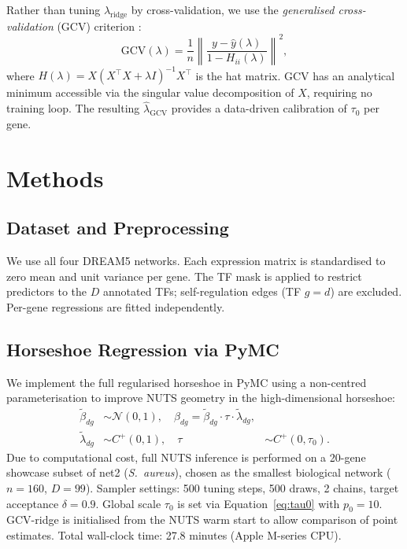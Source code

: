 \documentclass[11pt]{article}
\begin{document}
Rather than tuning $\lambda_{\mathrm{ridge}}$ by cross-validation, we use the
\textit{generalised cross-validation} (GCV) criterion \citep{golub1979}:
\begin{equation}
  \mathrm{GCV}(\lambda) = \frac{1}{n} \left\| \frac{y - \hat y(\lambda)}{1 - H_{ii}(\lambda)} \right\|^2,
\end{equation}
where $H(\lambda) = X(X^\top X + \lambda I)^{-1} X^\top$ is the hat matrix.
GCV has an analytical minimum accessible via the singular value decomposition of $X$,
requiring no training loop. The resulting $\hat\lambda_{\mathrm{GCV}}$ provides a
data-driven calibration of $\tau_0$ per gene.

\section{Methods}

\subsection{Dataset and Preprocessing}

We use all four DREAM5 networks. Each expression matrix is standardised to zero mean and
unit variance per gene. The TF mask is applied to restrict predictors to the $D$
annotated TFs; self-regulation edges (TF $g = d$) are excluded. Per-gene regressions are
fitted independently.

\subsection{Horseshoe Regression via PyMC}

We implement the full regularised horseshoe in PyMC using a non-centred parameterisation
to improve NUTS geometry in the high-dimensional horseshoe:
\begin{align}
  \tilde\beta_{dg} &\sim \mathcal{N}(0, 1), \quad
  \beta_{dg} = \tilde\beta_{dg} \cdot \tau \cdot \tilde\lambda_{dg}, \\
  \tilde\lambda_{dg} &\sim C^+(0,1), \quad
  \tau &\sim C^+(0, \tau_0).
\end{align}
Due to computational cost, full NUTS inference is performed on a 20-gene showcase subset
of net2 (\textit{S.~aureus}), chosen as the smallest biological network ($n = 160$,
$D = 99$). Sampler settings: 500 tuning steps, 500 draws, 2 chains, target acceptance
$\delta = 0.9$. Global scale $\tau_0$ is set via Equation~\eqref{eq:tau0} with $p_0 = 10$.
GCV-ridge is initialised from the NUTS warm start to allow comparison of point estimates.
Total wall-clock time: 27.8 minutes (Apple M-series CPU).
\end{document}
